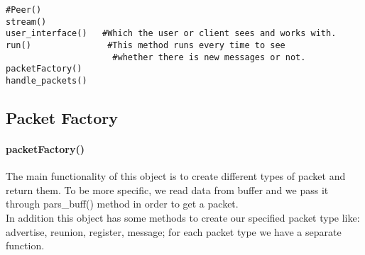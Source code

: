 \documentclass{article}
\begin{document}
\begin{lstlisting}
#Peer()
stream()
user_interface()   #Which the user or client sees and works with.
run() 				#This method runs every time to see
				     #whether there is new messages or not.
packetFactory()
handle_packets()
\end{lstlisting}
\subsection{Packet Factory}
\paragraph{packetFactory()}The main functionality of this object is to create different types of packet and return them. To be more specific, we read data from buffer and we pass it through pars\_buff() method in order to get a packet.
\\
In addition this object has some methods to create our specified packet type like: advertise, reunion, register, message; for each packet type we have a separate function.
\end{document}
